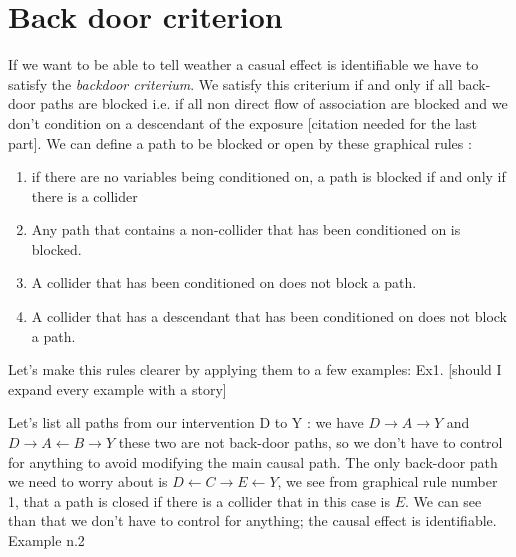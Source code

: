 \section{Back door criterion}
\label{sect:backdoor}
If we want to be able to tell weather a casual effect is identifiable we have to satisfy the \textit{backdoor criterium}. We satisfy this criterium if and only if all back-door paths are blocked i.e. if all non direct flow of association are blocked and we don't condition on a descendant of the exposure [citation needed for the last part].
We can define a path to be blocked or open by these graphical rules \citep{hernan2020causal}:
\begin{enumerate}
\item if there are no variables being conditioned on, a path is blocked if and only if there is a collider
\item Any path that contains a non-collider that has been conditioned on is blocked. 
\item A collider that has been conditioned on does not block a path. 
\item A collider that has a descendant that has been conditioned on does not block a path. 
\end{enumerate}
Let's make this rules clearer by applying them to a few examples: 
Ex1. [should I expand every example with a story]
\begin{figure}[H]
\centering
\end{figure} 
Let's list all paths from our intervention D to Y : we have  $D \rightarrow A \rightarrow Y$ and $D \rightarrow A \leftarrow B \rightarrow Y $  these two are not back-door paths, so we don't have to control for anything to avoid modifying the main causal path. The only back-door path we need to worry about is $D \leftarrow C \rightarrow E \leftarrow Y $, we see from graphical rule number 1, that a path is closed if there is a collider that in this case is $E$. We can see than that we don't have to control for anything; the causal effect is identifiable. 
Example n.2 
